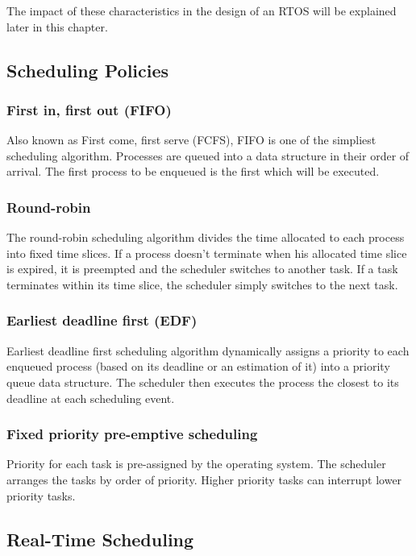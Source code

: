 The impact of these characteristics in the design of an RTOS will be explained later in this chapter.

\subsection{Scheduling Policies}

\subsubsection{First in, first out (FIFO)}
Also known as First come, first serve (FCFS), FIFO is one of the simpliest scheduling algorithm.
Processes are queued into a data structure in their order of arrival.
The first process to be enqueued is the first which will be executed.

\subsubsection{Round-robin}
The round-robin scheduling algorithm divides the time allocated to each process into fixed time slices.
If a process doesn't terminate when his allocated time slice is expired, it is preempted and the scheduler switches to another task.
If a task terminates within its time slice, the scheduler simply switches to the next task.

\subsubsection{Earliest deadline first (EDF)}
Earliest deadline first scheduling algorithm dynamically assigns a priority
    to each enqueued process (based on its deadline or an estimation of it) into a priority queue data structure.
The scheduler then executes the process the closest to its deadline at each scheduling event.

\subsubsection{Fixed priority pre-emptive scheduling}
Priority for each task is pre-assigned by the operating system.
The scheduler arranges the tasks by order of priority.
Higher priority tasks can interrupt lower priority tasks.

\subsection{Real-Time Scheduling}
